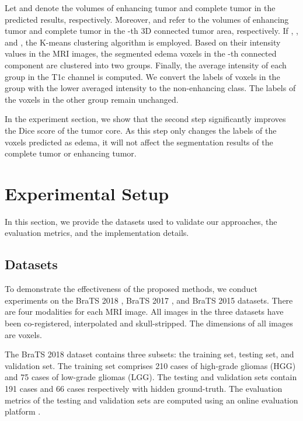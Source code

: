 \documentclass[journal,twoside]{IEEEtran}
\begin{document}
Let  and  denote the volumes of enhancing tumor and complete tumor in the predicted results, respectively. Moreover,  and  refer to the volumes of enhancing tumor and complete tumor in the -th 3D connected tumor area, respectively. If , , and , the K-means clustering algorithm is employed. Based on their intensity values in the MRI images, the segmented edema voxels in the -th connected component are clustered into two groups. Finally, the average intensity of each group in the T1c channel is computed. We convert the labels of voxels in the group with the lower averaged intensity to the non-enhancing class. The labels of the voxels in the other group remain unchanged.


 
In the experiment section, we show that the second step significantly improves the Dice score of the tumor core. As this step only changes the labels of the voxels predicted as edema, it will not affect the segmentation results of the complete tumor or enhancing tumor.  



\section{Experimental Setup}
In this section, we provide the datasets used to validate our approaches, the evaluation metrics, and the implementation details.


\subsection{Datasets}
To demonstrate the effectiveness of the proposed methods, we conduct experiments on the BraTS 2018 \cite{menze2015multimodal, bakas2017advancing, bakas2017segmentationlgg, bakas2017segmentationgbm,bakas2018identifying}, BraTS 2017 \cite{menze2015multimodal, bakas2017advancing, bakas2017segmentationlgg, bakas2017segmentationgbm}, and BraTS 2015 \cite{menze2015multimodal, kistler2013virtual} datasets. There are four modalities for each MRI image. All images in the three datasets have been co-registered, interpolated and skull-stripped. The dimensions of all images are  voxels. 



The BraTS 2018 dataset contains three subsets: the training set, testing set, and validation set. The training set comprises 210 cases of high-grade gliomas (HGG) and 75 cases of low-grade gliomas (LGG). The testing and validation sets contain 191 cases and 66 cases respectively with hidden ground-truth. The evaluation metrics of the testing and validation sets are computed using an online evaluation platform \cite{CBICAIPP2015}. 
\end{document}

